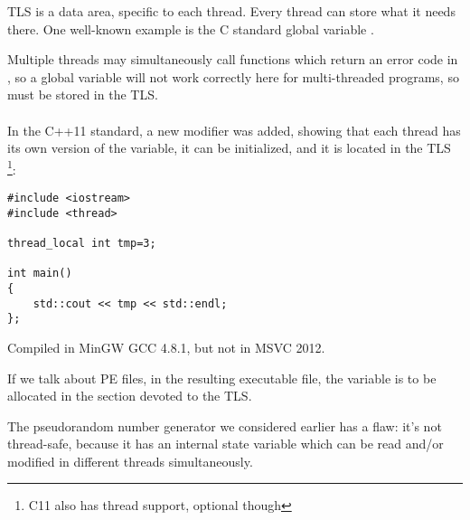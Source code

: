 \label{TLS}

TLS is a data area, specific to each thread. Every thread can store what it needs there.
One well-known example is the C standard global variable . 

Multiple threads may simultaneously call functions
which return an error code in , so a global variable will not work correctly here for multi-threaded programs,
so  must be stored in the \ac{TLS}. \\
\\
In the C++11 standard, a new  modifier was added, showing that each thread has its own version of the variable,
it can be initialized, and it is located in the \ac{TLS}
\footnote{ C11 also has thread support, optional though}:

\begin{lstlisting}[caption=C++11]
#include <iostream>
#include <thread>

thread_local int tmp=3;

int main()
{
	std::cout << tmp << std::endl;
};
\end{lstlisting}

Compiled in MinGW GCC 4.8.1, but not in MSVC 2012.

If we talk about PE files, in the resulting executable file, the  
variable is to be allocated in the section devoted to the \ac{TLS}.

\label{LCG_TLS}

The pseudorandom number generator we considered earlier  has a flaw:
it's not thread-safe, because it has an internal state variable which can be read and/or modified in different threads simultaneously.




